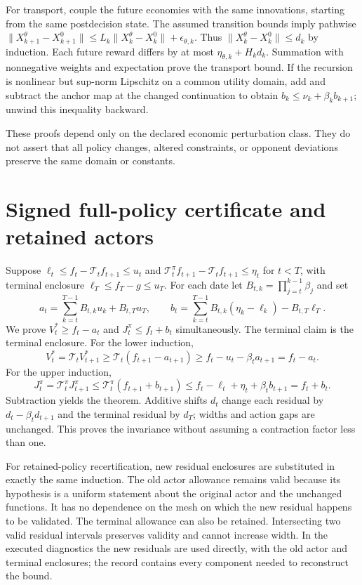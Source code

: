\documentclass[ecta,nameyear,draft]{econsocart}
\begin{document}
For transport, couple the future economies with the same innovations, starting from the same postdecision state. The assumed transition bounds imply pathwise
$\|X_{k+1}^\theta-X_{k+1}^0\|\leq L_k\|X_k^\theta-X_k^0\|+\epsilon_{\theta,k}$.
Thus $\|X_k^\theta-X_k^0\|\leq d_k$ by induction. Each future reward differs by at most $\eta_{\theta,k}+H_kd_k$. Summation with nonnegative weights and expectation prove the transport bound. If the recursion is nonlinear but sup-norm Lipschitz on a common utility domain, add and subtract the anchor map at the changed continuation to obtain $b_k\leq\nu_k+\beta_kb_{k+1}$; unwind this inequality backward.

These proofs depend only on the declared economic perturbation class. They do not assert that all policy changes, altered constraints, or opponent deviations preserve the same domain or constants.

\section{Signed full-policy certificate and retained actors}
Suppose $\ell_t\leq f_t-\mathcal T_tf_{t+1}\leq u_t$ and
$\mathcal T_t^\pi f_{t+1}-\mathcal T_tf_{t+1}\leq\eta_t$ for $t<T$, with terminal enclosure $\ell_T\leq f_T-g\leq u_T$.
For each date let $B_{t,k}=\prod_{j=t}^{k-1}\beta_j$ and set
\[
 a_t=\sum_{k=t}^{T-1}B_{t,k}u_k+B_{t,T}u_T,
 \qquad
 b_t=\sum_{k=t}^{T-1}B_{t,k}(\eta_k-\ell_k)-B_{t,T}\ell_T.
\]
We prove $V_t^*\geq f_t-a_t$ and $J_t^\pi\leq f_t+b_t$ simultaneously. The terminal claim is the terminal enclosure. For the lower induction,
\[
 V_t^*=\mathcal T_tV_{t+1}^*
 \geq\mathcal T_t(f_{t+1}-a_{t+1})
 \geq f_t-u_t-\beta_ta_{t+1}=f_t-a_t.
\]
For the upper induction,
\[
 J_t^\pi=\mathcal T_t^\pi J_{t+1}^\pi
 \leq\mathcal T_t^\pi(f_{t+1}+b_{t+1})
 \leq f_t-\ell_t+\eta_t+\beta_tb_{t+1}=f_t+b_t.
\]
Subtraction yields the theorem. Additive shifts $d_t$ change each residual by $d_t-\beta_td_{t+1}$ and the terminal residual by $d_T$; widths and action gaps are unchanged. This proves the invariance without assuming a contraction factor less than one.

For retained-policy recertification, new residual enclosures are substituted in exactly the same induction. The old actor allowance remains valid because its hypothesis is a uniform statement about the original actor and the unchanged functions. It has no dependence on the mesh on which the new residual happens to be validated. The terminal allowance can also be retained. Intersecting two valid residual intervals preserves validity and cannot increase width. In the executed diagnostics the new residuals are used directly, with the old actor and terminal enclosures; the record contains every component needed to reconstruct the bound.
\end{document}
